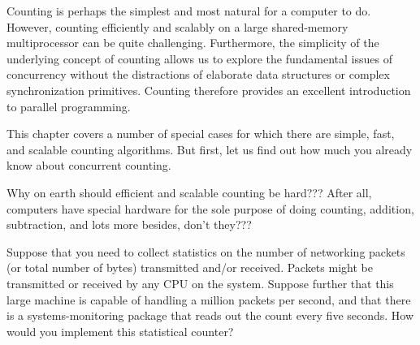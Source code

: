 

Counting is perhaps the simplest and most natural for a computer to do.
However, counting efficiently and scalably on a large
shared-memory multiprocessor can be quite challenging.
Furthermore, the simplicity of the underlying concept of counting
allows us to explore the fundamental issues of concurrency without
the distractions
of elaborate data structures or complex synchronization primitives.
Counting therefore provides an excellent introduction to
parallel programming.

This chapter covers a number of special cases for which there are simple,
fast, and scalable counting algorithms.
But first, let us find out how much you already know about concurrent
counting.

\QuickQuiz{}
	Why on earth should efficient and scalable counting be hard???
	After all, computers have special hardware for the sole purpose
	of doing counting,
	addition, subtraction, and lots more besides, don't they???
 \QuickQuizEnd

\QuickQuiz{}
	Suppose that you need to collect statistics on the number
	of networking packets (or total number of bytes) transmitted
	and/or received.
	Packets might be transmitted or received by any CPU on
	the system.
	Suppose further that this large machine is capable of
	handling a million packets per second, and that there
	is a systems-monitoring package that reads out the count
	every five seconds.
	How would you implement this statistical counter?
 \QuickQuizEnd

